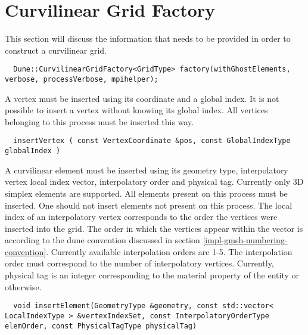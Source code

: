 \section{Curvilinear Grid Factory}
\label{interface-grid-factory}

This section will discuss the information that needs to be provided in order to construct a curvilinear grid. \\

\begin{mybox}
\begin{lstlisting}
  Dune::CurvilinearGridFactory<GridType> factory(withGhostElements, verbose, processVerbose, mpihelper);
\end{lstlisting}
\end{mybox}

\noindent
A vertex must be inserted using its coordinate and a global index. It is not possible to insert a vertex without knowing its global index. All vertices belonging to this process must be inserted this way. \\

\begin{mybox}
\begin{lstlisting}
  insertVertex ( const VertexCoordinate &pos, const GlobalIndexType globalIndex )
\end{lstlisting}
\end{mybox}

\noindent
A curvilinear element must be inserted using its geometry type, interpolatory vertex local index vector, interpolatory order and physical tag. Currently only 3D simplex elements are supported. All elements present on this process must be inserted. One should not insert elements not present on this process. The local index of an interpolatory vertex corresponds to the order the vertices were inserted into the grid. The order in which the vertices appear within the vector is according to the dune convention discussed in section \ref{impl-gmsh-numbering-convention}. Currently available interpolation orders are 1-5. The interpolation order must correspond to the number of interpolatory vertices. Currently, physical tag is an integer corresponding to the material property of the entity or otherwise.   \\

\begin{mybox}
\begin{lstlisting}
  void insertElement(GeometryType &geometry, const std::vector< LocalIndexType > &vertexIndexSet, const InterpolatoryOrderType elemOrder, const PhysicalTagType physicalTag)
\end{lstlisting}
\end{mybox}


